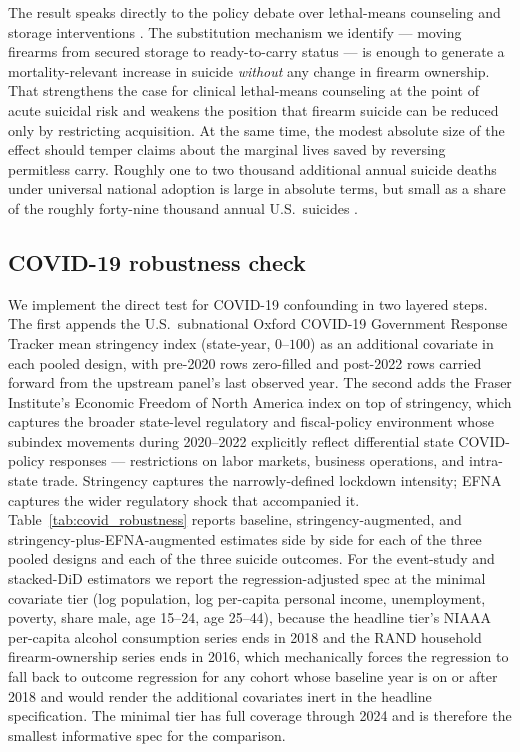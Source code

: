 \documentclass[12pt]{article}
\begin{document}
The result speaks directly to the policy debate over lethal-means
counseling and storage interventions \citep{mccourt2020,
anestis2017}. The substitution mechanism we identify --- moving
firearms from secured storage to ready-to-carry status --- is
enough to generate a mortality-relevant increase in suicide
\emph{without} any change in firearm ownership. That strengthens
the case for clinical lethal-means counseling at the point of
acute suicidal risk and weakens the position that firearm suicide
can be reduced only by restricting acquisition. At the same time,
the modest absolute size of the effect should temper claims about
the marginal lives saved by reversing permitless carry. Roughly
one to two thousand additional annual suicide deaths under
universal national adoption is large in absolute terms, but small
as a share of the roughly forty-nine thousand annual U.S.\ suicides
\citep{cdcwonder}.

\subsection*{COVID-19 robustness check}\label{sec:covidrobust}

We implement the direct test for COVID-19 confounding in two
layered steps. The first appends the U.S.\ subnational
\citet{hale2021} Oxford COVID-19 Government Response Tracker mean
stringency index (state-year, $0$--$100$) as an additional
covariate in each pooled design, with pre-2020 rows zero-filled and
post-2022 rows carried forward from the upstream panel's last
observed year. The second adds the Fraser Institute's Economic
Freedom of North America index \citep{stansel2023} on top of
stringency, which captures the broader state-level regulatory and
fiscal-policy environment whose subindex movements during 2020--2022
explicitly reflect differential state COVID-policy responses ---
restrictions on labor markets, business operations, and
intra-state trade. Stringency captures the narrowly-defined
lockdown intensity; EFNA captures the wider regulatory shock that
accompanied it. Table~\ref{tab:covid_robustness} reports baseline,
stringency-augmented, and stringency-plus-EFNA-augmented estimates
side by side for each of the three pooled designs and each of the
three suicide outcomes. For the event-study and stacked-DiD
estimators we report the regression-adjusted spec at the minimal
covariate tier (log population, log per-capita personal income,
unemployment, poverty, share male, age 15--24, age 25--44),
because the headline tier's NIAAA per-capita alcohol consumption
series ends in 2018 and the RAND household firearm-ownership series
ends in 2016, which mechanically forces the regression to fall back
to outcome regression for any cohort whose baseline year is on or
after 2018 and would render the additional covariates inert in the
headline specification. The minimal tier has full coverage through
2024 and is therefore the smallest informative spec for the
comparison.
\end{document}
